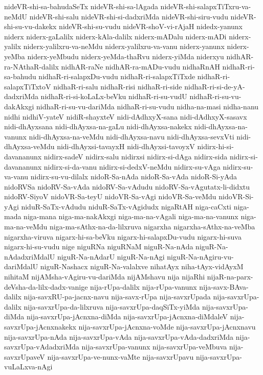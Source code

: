 {nideVR-shi-sa-bahudaSeTx
nideVR-shi-sa-lAgada
nideVR-shi-salapxTiTxru-va-neMdU
nideVR-shi-salu
nideVR-shi-si-dadxriMda
nideVR-shi-siru-vudu
nideVR-shi-su-vu-dakekx
nideVR-shi-su-vudu
nideVR-shoV-vi-rAjaH
nidedx-yanunx
niderx
niderx-gaLalilx
niderx-kAla-dalilx
niderx-mADalu
niderx-mADi
niderx-yalilx
niderx-yalilxru-va-neMdu
niderx-yalilxru-va-vanu
niderx-yanunx
niderx-yeMba
niderx-yeMbudu
niderx-yeMda-thaRvu
niderx-yiMda
niderxyu
nidhAR-ra-NAthaR-dalilx
nidhAR-raNe
nidhAR-ra-mADu-vudu
nidhaRnAH
nidhaR-ri-sa-bahudu
nidhaR-ri-salapxDu-vudu
nidhaR-ri-salapxTiTxde
nidhaR-ri-salapxTiTxtoV
nidhaR-ri-salu
nidhaR-risi
nidhaR-ri-side
nidhaR-ri-si-de-yA-dadxriMda
nidhaR-ri-si-koLaLx-beVku
nidhaR-ri-su-vudU
nidhaR-ri-su-vu-dakAkxgi
nidhaR-ri-su-vu-dariMda
nidhaR-ri-su-vudu
nidha-na-masi
nidha-nanu
nidhi
nidhiV-yateV
nidiR-shayxteV
nidi-dAdhxyX-sana
nidi-dAdhxyX-sasavx
nidi-dhAyxsana
nidi-dhAyxsa-na-gaLu
nidi-dhAyxsa-nakekx
nidi-dhAyxsa-na-vanunx
nidi-dhAyxsa-na-veMdu
nidi-dhAyxsa-navu
nidi-dhAyxsa-sevxVti
nidi-dhAyxsa-veMdu
nidi-dhAyxsi-tavayxH
nidi-dhAyxsi-tavoyxV
nidirx-hi-si-davananunx
nidirx-sadeV
nidirx-salu
nidirxsi
nidirx-si-dAga
nidirx-sida
nidirx-si-davananunx
nidirx-si-da-vanu
nidirx-si-dedxV-neMdu
nidirx-su-vAga
nidirx-su-va-vanu
nidirx-su-vu-dilalx
nidoR-Sa-nAda
nidoR-Sa-vAda
nidoR-Si-yAda
nidoRVSa
nidoRV-Sa-vAda
nidoRV-Sa-vAdudu
nidoRV-Sa-vAgutatx-li-didxtu
nidoRV-SiyoV
nidoVR-Sa-teyU
nidoVR-Sa-vAgi
nidoVR-Sa-veMdu
nidoVR-Si-yAgi
niduR-SaTx-vAdudu
niduR-SaTx-vAgidudx
nigaRtAH
niga-caCxti
niga-mada
niga-mana
niga-ma-nakAkxgi
niga-ma-na-vAgali
niga-ma-na-vanunx
niga-ma-na-veMdu
niga-ma-sAthx-na-da-lilxruva
nigarxha
nigarxha-sAthx-na-veMba
nigarxha-viruva
nigarx-hi-sa-beVku
nigarx-hi-salapxDu-vudu
nigarx-hi-suva
nigarx-hi-su-vudu
nige
niguRNa
niguRNaM
niguR-Na-nAda
niguR-Na-nAdadxriMdalU
niguR-Na-nAdarU
niguR-Na-nAgi
niguR-Na-nAgiru-vu-dariMdalU
niguR-Nashacx
niguR-Na-valalxve
nihatAyx
niha-tAyx-vidAyxM
nihitaM
nijAMsha-vAgiru-vu-dariMda
nijAMshavu
nija
nijaRhi
nijaR-na-parx-deVsha-da-lilx-dadx-vanige
nija-rUpa-dalilx
nija-rUpa-vanunx
nija-savx-BAva-dalilx
nija-savxRU-pa-jacnx-navu
nija-savx-rUpa
nija-savxrUpada
nija-savxrUpa-dalilx
nija-savxrUpa-da-lilxruva
nija-savxrUpa-daqSiTx-yiMda
nija-savxrUpa-diMda
nija-savxrUpa-jAcnxna-diMda
nija-savxrUpa-jAcnxna-diMdaleV
nija-savxrUpa-jAcnxnakekx
nija-savxrUpa-jAcnxna-voMde
nija-savxrUpa-jAcnxnavu
nija-savxrUpa-nAda
nija-savxrUpa-vAda
nija-savxrUpa-vAda-dadxriMda
nija-savxrUpa-vAdadxriMda
nija-savxrUpa-vanunx
nija-savxrUpa-veMbuva
nija-savxrUpaveV
nija-savxrUpa-ve-nunx-vaMte
nija-savxrUpavu
nija-savxrUpa-vuLaLxva-nAgi
}
